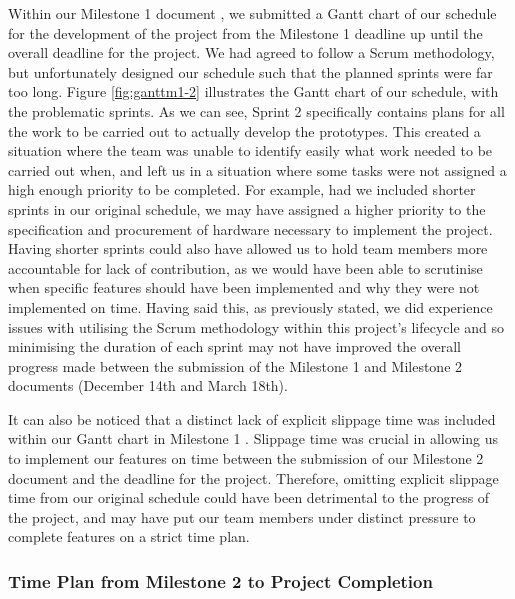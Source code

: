                 Within our Milestone 1 document \cite{coaker}, we submitted a Gantt chart of our schedule for the development of the project from the Milestone 1 deadline up until the overall deadline for the project. We had agreed to follow a Scrum methodology, but unfortunately designed our schedule such that the planned sprints were far too long. Figure \ref{fig:ganttm1-2} illustrates the Gantt chart of our schedule, with the problematic sprints. As we can see, Sprint 2 specifically contains plans for all the work to be carried out to actually develop the prototypes. This created a situation where the team was unable to identify easily what work needed to be carried out when, and left us in a situation where some tasks were not assigned a high enough priority to be completed. For example, had we included shorter sprints in our original schedule, we may have assigned a higher priority to the specification and procurement of hardware necessary to implement the project. Having shorter sprints could also have allowed us to hold team members more accountable for lack of contribution, as we would have been able to scrutinise when specific features should have been implemented and why they were not implemented on time. Having said this, as previously stated, we did experience issues with utilising the Scrum methodology within this project's lifecycle and so minimising the duration of each sprint may not have improved the overall progress made between the submission of the Milestone 1 and Milestone 2 documents (December 14th and March 18th).

                It can also be noticed that a distinct lack of explicit slippage time was included within our Gantt chart in Milestone 1 \cite{coaker}. Slippage time was crucial in allowing us to implement our features on time between the submission of our Milestone 2 document and the deadline for the project. Therefore, omitting explicit slippage time from our original schedule could have been detrimental to the progress of the project, and may have put our team members under distinct pressure to complete features on a strict time plan.

                

            \subsubsection{Time Plan from Milestone 2 to Project Completion}
        
